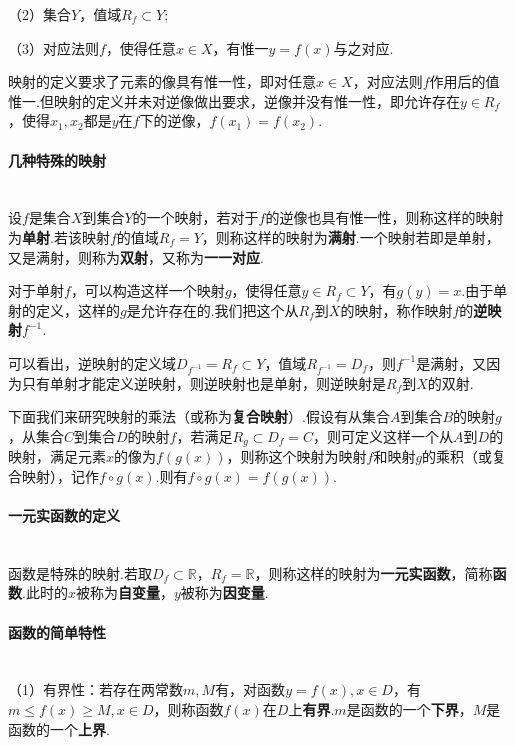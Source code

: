 \documentclass{ctexbook}
\begin{document}
	（2）集合$Y$，值域$R_f \subset Y$;
	
	（3）对应法则$f$，使得任意$x\in X$，有惟一$y=f(x)$与之对应.
	
	映射的定义要求了元素的像具有惟一性，即对任意$x\in X$，对应法则$f$作用后的值惟一.但映射的定义并未对逆像做出要求，逆像并没有惟一性，即允许存在$y\in R_f$，使得$x_1,x_2$都是$y$在$f$下的逆像，$f(x_1)=f(x_2)$.
	
	\paragraph{几种特殊的映射}~{}
	\\
	\indent
	设$f$是集合$X$到集合$Y$的一个映射，若对于$f$的逆像也具有惟一性，则称这样的映射为\textbf{单射}.若该映射$f$的值域$R_f=Y$，则称这样的映射为\textbf{满射}.一个映射若即是单射，又是满射，则称为\textbf{双射}，又称为\textbf{一一对应}.
	
	对于单射$f$，可以构造这样一个映射$g$，使得任意$y\in R_f\subset Y$，有$g(y)=x$.由于单射的定义，这样的$g$是允许存在的.我们把这个从$R_f$到$X$的映射，称作映射$f$的\textbf{逆映射}$f^{-1}$.
	
	可以看出，逆映射的定义域$D_{f^{-1}}=R_f \subset Y$，值域$R_{f^{-1}}=D_f$，则$f^{-1}$是满射，又因为只有单射才能定义逆映射，则逆映射也是单射，则逆映射是$R_f$到$X$的双射.
	
	下面我们来研究映射的乘法（或称为\textbf{复合映射}）.假设有从集合$A$到集合$B$的映射$g$，从集合$C$到集合$D$的映射$f$，若满足$R_g \subset D_f=C$，则可定义这样一个从$A$到$D$的映射，满足元素$x$的像为$f(g(x))$，则称这个映射为映射$f$和映射$g$的乘积（或复合映射），记作$f\circ g(x)$.则有$f\circ g(x)=f(g(x))$.
	
	\paragraph{一元实函数的定义}~{}
	\\
	\indent
	函数是特殊的映射.若取$D_f \subset \mathbb{R}$，$R_f = \mathbb{R}$，则称这样的映射为\textbf{一元实函数}，简称\textbf{函数}.此时的$x$被称为\textbf{自变量}，$y$被称为\textbf{因变量}.
	
	\paragraph{函数的简单特性}~{}
	\\
	\indent
	（1）有界性：若存在两常数$m,M$有，对函数$y=f(x),x\in D$，有$m\le f(x)\ge M,x\in D$，则称函数$f(x)$在$D$上\textbf{有界}.$m$是函数的一个\textbf{下界}，$M$是函数的一个\textbf{上界}.
	
\end{document}

